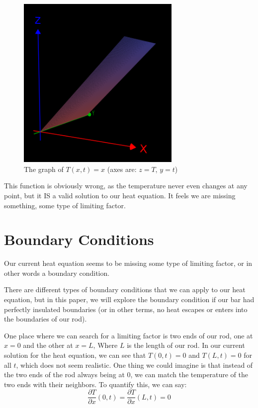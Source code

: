 \documentclass{report}
\begin{document}
\begin{figure}[H]
    \centering
    \includegraphics[width=0.7\textwidth]{images/x_no_boundary_function.png}
    \caption{The graph of $T(x,t) = x$ (axes are: $z = T$, $y = t$) }
\end{figure}

This function is obviously wrong, as the temperature never even changes at any point, but it IS a valid solution to our
heat equation. It feels we are missing something, some type of limiting factor.

\section{Boundary Conditions}

Our current heat equation seems to be missing some type of limiting factor, or in other words a boundary condition.

There are different types of boundary conditions that we can apply to our heat equation, but in this paper, we will
explore the boundary condition if our bar had perfectly insulated boundaries (or in other terms, no heat escapes or enters 
into the boundaries of our rod). 

One place where we can search for a limiting factor is two ends of our rod, one at $x=0$ and the other at $x=L$,
Where $L$ is the length of our rod.
In our current solution for the heat equation, we can see that  $T(0,t) = 0$ and $T(L,t) = 0$ for all $t$, which 
does not seem realistic. One thing we could imagine is that instead of the two ends of the rod always being at 0\textdegree, we can match the temperature of the two ends with their neighbors. To quantify this, we can say: 
\[ \frac{\partial T}{\partial x}(0,t) = \frac{\partial T}{\partial x}(L,t) = 0 \]
\end{document}
